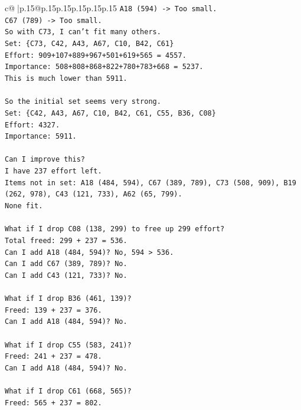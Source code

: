 \documentclass{article}
\begin{document}
{\begin{supertabular}{c@{$\;$}|p{.15\linewidth}@{}p{.15\linewidth}p{.15\linewidth}p{.15\linewidth}p{.15\linewidth}p{.15\linewidth}}
{{{\texttt{A18 (594) {-}> Too small.} \\
\texttt{C67 (789) {-}> Too small.} \\
\texttt{So with C73, I can't fit many others.} \\
\texttt{Set: \{C73, C42, A43, A67, C10, B42, C61\}} \\
\texttt{Effort: 909+107+889+967+501+619+565 = 4557.} \\
\texttt{Importance: 508+808+868+822+780+783+668 = 5237.} \\
\texttt{This is much lower than 5911.} \\
\\ 
\texttt{So the initial set seems very strong.} \\
\texttt{Set: \{C42, A43, A67, C10, B42, C61, C55, B36, C08\}} \\
\texttt{Effort: 4327.} \\
\texttt{Importance: 5911.} \\
\\ 
\texttt{Can I improve this?} \\
\texttt{I have 237 effort left.} \\
\texttt{Items not in set: A18 (484, 594), C67 (389, 789), C73 (508, 909), B19 (262, 978), C43 (121, 733), A62 (65, 799).} \\
\texttt{None fit.} \\
\\ 
\texttt{What if I drop C08 (138, 299) to free up 299 effort?} \\
\texttt{Total freed: 299 + 237 = 536.} \\
\texttt{Can I add A18 (484, 594)? No, 594 > 536.} \\
\texttt{Can I add C67 (389, 789)? No.} \\
\texttt{Can I add C43 (121, 733)? No.} \\
\\ 
\texttt{What if I drop B36 (461, 139)?} \\
\texttt{Freed: 139 + 237 = 376.} \\
\texttt{Can I add A18 (484, 594)? No.} \\
\\ 
\texttt{What if I drop C55 (583, 241)?} \\
\texttt{Freed: 241 + 237 = 478.} \\
\texttt{Can I add A18 (484, 594)? No.} \\
\\ 
\texttt{What if I drop C61 (668, 565)?} \\
\texttt{Freed: 565 + 237 = 802.} \\
}}}
\end{supertabular}}
\end{document}
